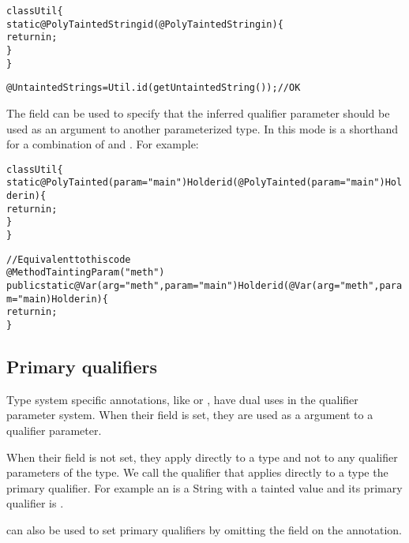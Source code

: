 \begin{description}
\begin{alltt}

  class Util \{
    static @PolyTainted String id(@PolyTainted String in) \{
        return in;
    \}
  \}

  @Untainted String s = Util.id(getUntaintedString());  // OK
\end{alltt}

The field  can be used to specify that the inferred qualifier
parameter should be used as an argument to another parameterized type. In
this mode  is a shorthand for a combination of
 and . For example:

\begin{alltt}

  class Util \{
    static @PolyTainted(param="main") Holder id(@PolyTainted(param="main") Holder in) \{
        return in;
    \}
  \}

  // Equivalent to this code
  @MethodTaintingParam("meth")
  public static @Var(arg="meth", param="main") Holder id(@Var(arg="meth", param="main) Holder in) \{
      return in;
  \}

\end{alltt}
\end{description}


\subsection{Primary qualifiers\label{primary-qualifiers}}


Type system specific annotations, like  or , have
dual uses in the qualifier parameter system. When their  field
is set, they are used as a argument to a qualifier parameter.

When their  field
is not set, they apply directly to a type and not to any qualifier
parameters of the type. We call the qualifier that applies directly to a
type the primary qualifier. For example an 
is a String with a tainted value and its primary qualifier is .

 can also be used to set primary qualifiers by omitting the
 field on the annotation.


